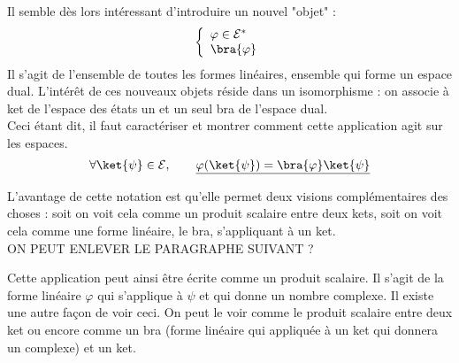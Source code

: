 Il semble dès lors intéressant d'introduire un nouvel "objet" : 
\begin{equation}
\left\{\begin{array}{ll}
\varphi \in \mathcal{E}^*\\
\bra{\varphi}
\end{array}\right.
\end{equation}
Il s'agit de l'ensemble de toutes les formes linéaires, ensemble qui forme un espace dual. 
L'intérêt de ces nouveaux objets réside dans un isomorphisme : on associe à ket de l'espace des états 
un et un seul bra de l'espace dual.\\

Ceci étant dit, il faut caractériser et montrer comment cette application agit sur les espaces. 
\begin{equation}
\forall \ket{\psi} \in \mathcal{E},\qquad \underline{\varphi(\ket{\psi}) =\bra{\varphi}\ket{\psi}}
\end{equation}

L'avantage de cette notation est qu'elle permet deux visions complémentaires des choses :
soit on voit cela comme un produit scalaire entre deux kets, soit on voit cela comme une
forme linéaire, le bra, s'appliquant à un ket.\\

ON PEUT ENLEVER LE PARAGRAPHE SUIVANT ?

Cette application peut ainsi être écrite comme un produit scalaire. Il s'agit de la forme 
linéaire $\varphi$ qui s'applique à $\psi$ et qui donne un nombre complexe. Il existe une 
autre façon de voir ceci. On peut le voir comme le produit scalaire entre deux ket ou encore 
comme un bra (forme linéaire qui appliquée à un ket qui donnera un complexe) et un ket.\\
 
